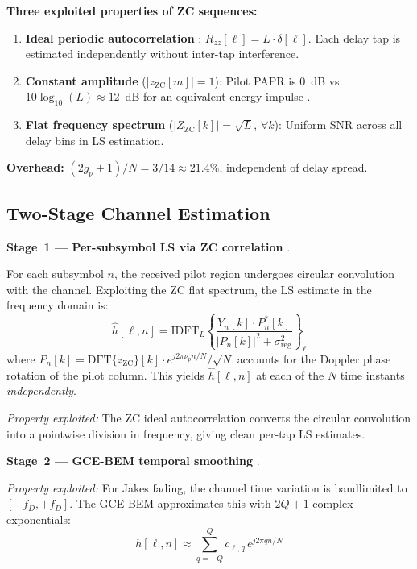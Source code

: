 \documentclass[11pt,a4paper,twoside]{article}
\newcommand{\hest}{\hat{h}}
\begin{document}
\textbf{Three exploited properties of ZC sequences:}
\begin{enumerate}
    \item \textbf{Ideal periodic autocorrelation} \cite{chu1972}: $R_{zz}[\ell] = L \cdot \delta[\ell]$. Each delay tap is estimated independently without inter-tap interference.
    \item \textbf{Constant amplitude} ($|z_{\text{ZC}}[m]| = 1$): Pilot PAPR is 0~dB vs.\ $10\log_{10}(L) \approx 12$~dB for an equivalent-energy impulse \cite{pcp2023}.
    \item \textbf{Flat frequency spectrum} ($|Z_{\text{ZC}}[k]| = \sqrt{L}$, $\forall k$): Uniform SNR across all delay bins in LS estimation.
\end{enumerate}

\textbf{Overhead:} $(2 g_\nu{+}1)/N = 3/14 \approx 21.4\%$, independent of delay spread.

\subsection{Two-Stage Channel Estimation}

\textbf{Stage~1 --- Per-subsymbol LS via ZC correlation} \cite{pcp2023, schwipps2025}.

For each subsymbol $n$, the received pilot region undergoes circular convolution with the channel. Exploiting the ZC flat spectrum, the LS estimate in the frequency domain is:
\begin{equation}
    \hest[\ell, n] = \text{IDFT}_L\!\left\{ \frac{Y_n[k] \cdot P_n^*[k]}{|P_n[k]|^2 + \sigma^2_{\text{reg}}} \right\}_\ell
    \label{eq:stage1_v2}
\end{equation}
where $P_n[k] = \text{DFT}\{z_{\text{ZC}}\}[k] \cdot e^{j2\pi \nu_p n/N} / \sqrt{N}$ accounts for the Doppler phase rotation of the pilot column. This yields $\hest[\ell, n]$ at each of the $N$ time instants \emph{independently}.

\textit{Property exploited:} The ZC ideal autocorrelation converts the circular convolution into a pointwise division in frequency, giving clean per-tap LS estimates.

\textbf{Stage~2 --- GCE-BEM temporal smoothing} \cite{giannakis1998, schwipps2025}.

\textit{Property exploited:} For Jakes fading, the channel time variation is bandlimited to $[-f_D, +f_D]$. The GCE-BEM \cite{giannakis1998} approximates this with $2Q{+}1$ complex exponentials:
\begin{equation}
    h[\ell, n] \approx \sum_{q=-Q}^{Q} c_{\ell,q} \, e^{j2\pi q n / N}
    \label{eq:bem_v2}
\end{equation}
\end{document}
